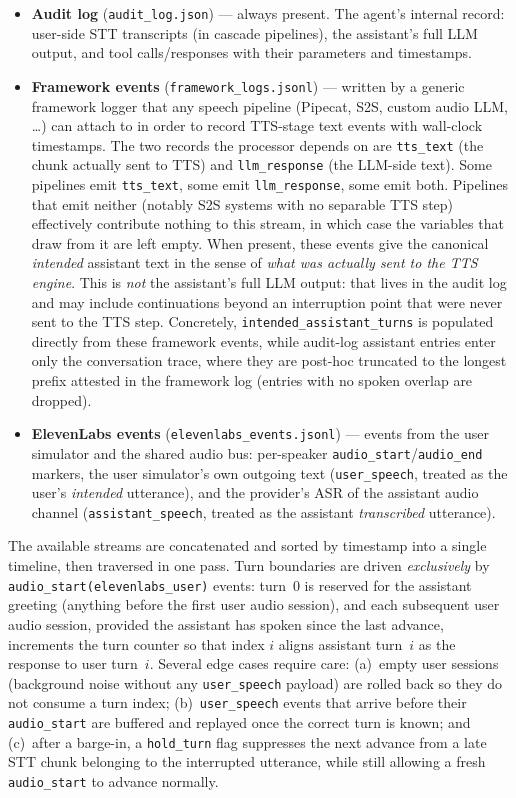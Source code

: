 \begin{itemize}
    \item \textbf{Audit log} (\texttt{audit\_log.json}) --- always present. The agent's internal record: user-side STT transcripts (in cascade pipelines), the assistant's full LLM output, and tool calls/responses with their parameters and timestamps.
    \item \textbf{Framework events} (\texttt{framework\_logs.jsonl}) --- written by a generic framework logger that any speech pipeline (Pipecat, S2S, custom audio LLM, \dots) can attach to in order to record TTS-stage text events with wall-clock timestamps. The two records the processor depends on are \texttt{tts\_text} (the chunk actually sent to TTS) and \texttt{llm\_response} (the LLM-side text). Some pipelines emit \texttt{tts\_text}, some emit \texttt{llm\_response}, some emit both. Pipelines that emit neither (notably S2S systems with no separable TTS step) effectively contribute nothing to this stream, in which case the variables that draw from it are left empty. When present, these events give the canonical \emph{intended} assistant text in the sense of \emph{what was actually sent to the TTS engine}. This is \emph{not} the assistant's full LLM output: that lives in the audit log and may include continuations beyond an interruption point that were never sent to the TTS step. Concretely, \texttt{intended\_assistant\_turns} is populated directly from these framework events, while audit-log assistant entries enter only the conversation trace, where they are post-hoc truncated to the longest prefix attested in the framework log (entries with no spoken overlap are dropped).
    \item \textbf{ElevenLabs events} (\texttt{elevenlabs\_events.jsonl}) --- events from the user simulator and the shared audio bus: per-speaker \texttt{audio\_start}/\texttt{audio\_end} markers, the user simulator's own outgoing text (\texttt{user\_speech}, treated as the user's \emph{intended} utterance), and the provider's ASR of the assistant audio channel (\texttt{assistant\_speech}, treated as the assistant \emph{transcribed} utterance).
\end{itemize}

The available streams are concatenated and sorted by timestamp into a single timeline, then traversed in one pass. Turn boundaries are driven \emph{exclusively} by \texttt{audio\_start(elevenlabs\_user)} events: turn~0 is reserved for the assistant greeting (anything before the first user audio session), and each subsequent user audio session, provided the assistant has spoken since the last advance, increments the turn counter so that index $i$ aligns assistant turn~$i$ as the response to user turn~$i$. Several edge cases require care: (a)~empty user sessions (background noise without any \texttt{user\_speech} payload) are rolled back so they do not consume a turn index; (b)~\texttt{user\_speech} events that arrive before their \texttt{audio\_start} are buffered and replayed once the correct turn is known; and (c)~after a barge-in, a \texttt{hold\_turn} flag suppresses the next advance from a late STT chunk belonging to the interrupted utterance, while still allowing a fresh \texttt{audio\_start} to advance normally. 



